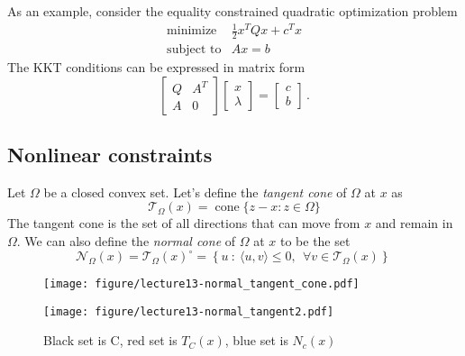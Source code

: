 \documentclass[12pt]{article}
\begin{document}
As an example, consider the equality constrained quadratic optimization problem
\begin{equation*} 
  \begin{array}{ll} 
  \text{minimize} &\frac{1}{2} x^TQx + c^T x\\
  \text{subject to} &Ax = b 
  \end{array}
\end{equation*}
The KKT conditions can be expressed in matrix form
 $$\left[\begin{array}{cc} 
  Q &A^T\\
  A & 0 \end{array} \right]
    \left[\begin{array}{c} 
x\\
\lambda\end{array} \right] =  
\left[\begin{array}{c} 
c\\
b\end{array} \right] \,.$$


\subsection{Nonlinear constraints}

Let $\Omega$ be a closed convex set.  Let's define the \emph{tangent cone} of $\Omega$ at $x$ as 
\[
\mathcal{T}_{\Omega}(x) = \operatorname{cone} \{z - x : z \in \Omega\}
\]
The tangent cone is the set of all directions that can move from $x$ and remain in $\Omega$.  We can also define the \emph{normal cone} of $\Omega$ at $x$ to be the set
\[
	\mathcal{N}_{\Omega}(x) = \mathcal{T}_{\Omega}(x)^\circ = \left\{ u~:~ \langle u,v \rangle \leq 0,~~\forall v\in \mathcal{T}_{\Omega}(x) \right\} \,
\]



\begin{figure}[h!]
    \vspace{-3cm}
    \hspace{-5cm}
    \begin{minipage}{0.45\textwidth}
        \texttt{[image: figure/lecture13-normal\_tangent\_cone.pdf]} %
    \end{minipage}\hfill
    \begin{minipage}{0.45\textwidth}
        \texttt{[image: figure/lecture13-normal\_tangent2.pdf]} %
    \end{minipage}
    \hspace{5cm}
    \vspace{-5cm}
    \caption{Black set is C, red set is $T_C(x)$, blue set is $N_c(x)$}
\end{figure}
\end{document}
